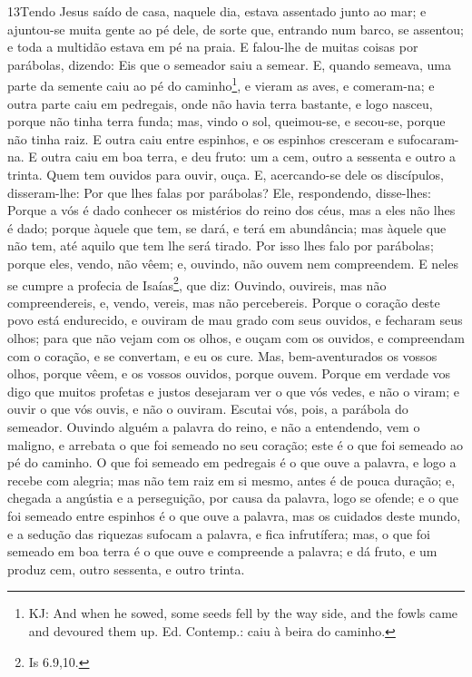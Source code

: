 \lettrine{13} Tendo Jesus saído de casa, naquele dia, estava
assentado junto ao mar; e ajuntou-se muita gente ao pé dele, de
sorte que, entrando num barco, se assentou; e toda a multidão estava
em pé na praia. E falou-lhe de muitas coisas por parábolas,
dizendo: Eis que o semeador saiu a semear. E, quando semeava,
uma parte da semente caiu ao pé do caminho\footnote{KJ: And when he
sowed, some seeds fell by the way side, and the fowls came and
devoured them up. Ed. Contemp.: caiu à beira do caminho.}, e vieram
as aves, e comeram-na; e outra parte caiu em pedregais, onde não
havia terra bastante, e logo nasceu, porque não tinha terra funda;
mas, vindo o sol, queimou-se, e secou-se, porque não tinha raiz.
E outra caiu entre espinhos, e os espinhos cresceram e
sufocaram-na. E outra caiu em boa terra, e deu fruto: um a cem,
outro a sessenta e outro a trinta. Quem tem ouvidos para ouvir,
ouça. E, acercando-se dele os discípulos, disseram-lhe: Por
que lhes falas por parábolas? Ele, respondendo, disse-lhes:
Porque a vós é dado conhecer os mistérios do reino dos céus, mas a
eles não lhes é dado; porque àquele que tem, se dará, e terá
em abundância; mas àquele que não tem, até aquilo que tem lhe será
tirado. Por isso lhes falo por parábolas; porque eles, vendo,
não vêem; e, ouvindo, não ouvem nem compreendem. E neles se
cumpre a profecia de Isaías\footnote{Is 6.9,10.}, que diz: Ouvindo,
ouvireis, mas não compreendereis, e, vendo, vereis, mas não
percebereis. Porque o coração deste povo está endurecido, e
ouviram de mau grado com seus ouvidos, e fecharam seus olhos; para
que não vejam com os olhos, e ouçam com os ouvidos, e compreendam
com o coração, e se convertam, e eu os cure. Mas,
bem-aventurados os vossos olhos, porque vêem, e os vossos ouvidos,
porque ouvem. Porque em verdade vos digo que muitos profetas
e justos desejaram ver o que vós vedes, e não o viram; e ouvir o que
vós ouvis, e não o ouviram. Escutai vós, pois, a parábola do
semeador. Ouvindo alguém a palavra do reino, e não a
entendendo, vem o maligno, e arrebata o que foi semeado no seu
coração; este é o que foi semeado ao pé do caminho. O que foi
semeado em pedregais é o que ouve a palavra, e logo a recebe com
alegria; mas não tem raiz em si mesmo, antes é de pouca
duração; e, chegada a angústia e a perseguição, por causa da
palavra, logo se ofende; e o que foi semeado entre espinhos é
o que ouve a palavra, mas os cuidados deste mundo, e a sedução das
riquezas sufocam a palavra, e fica infrutífera; mas, o que
foi semeado em boa terra é o que ouve e compreende a palavra; e dá
fruto, e um produz cem, outro sessenta, e outro trinta.

